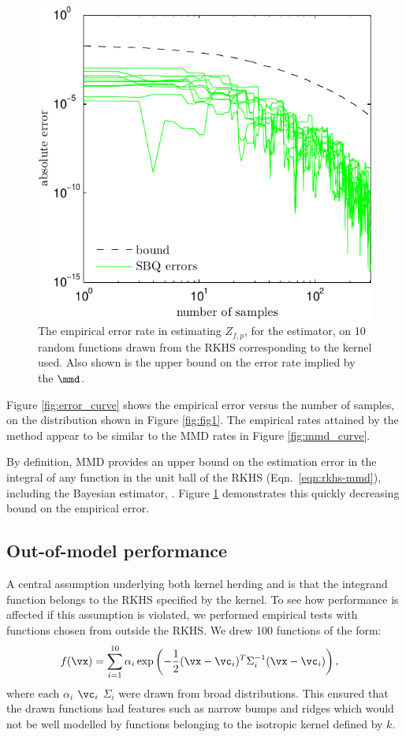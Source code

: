 \begin{figure}[t]
\centering
\includegraphics[width=.8\columnwidth]{figs/herding/bound_curve_rkhs}
\caption[Illustrating MMD as an upper bound on empirical error rate]{The empirical error rate in estimating $Z_{f,p}$,  for the \sbq{} estimator, on 10 random functions drawn from the RKHS corresponding to the kernel used. Also shown is the upper bound on the error rate implied by the $\mmd$.}
\label{fig:bound_curve}
\end{figure}

Figure \ref{fig:error_curve} shows the empirical error versus the number of samples, on the distribution shown in Figure \ref{fig:fig1}. The empirical rates attained by the method appear to be similar to the MMD rates in Figure \ref{fig:mmd_curve}.

By definition, MMD provides an upper bound on the estimation error in the integral of any function in the unit ball of the RKHS (Eqn.\ \eqref{eqn:rkhs-mmd}), including the Bayesian estimator, \sbq{}. Figure \ref{fig:bound_curve} demonstrates this quickly decreasing bound on the \sbq{} empirical error.

\subsection{Out-of-model performance}

A central assumption underlying both kernel herding and \sbq{} is that the integrand function belongs to the RKHS specified by the kernel. To see how performance is affected if this assumption is violated, we performed empirical tests with functions chosen from outside the RKHS. We drew 100 functions of the form:
%
\begin{align}
f(\vx) & = \sum_{i=1}^{10} \alpha_i \exp\left(-\frac{1}{2} (\vx -\vc_i)^T \Sigma_i^{-1} (\vx -\vc_i)\right),
\end{align}
%
where each $\alpha_i$ $\vc_i$ $\Sigma_i$ were drawn from broad distributions. This ensured that the drawn functions had features such as narrow bumps and ridges which would not be well modelled by functions belonging to the isotropic kernel defined by $k$.


